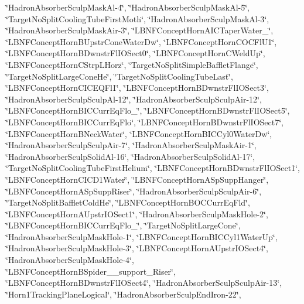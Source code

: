 \begin{DoxyCompactItemize}
\char`\"{}Hadron\-Absorber\-Sculp\-Mask\-Al-\/4\char`\"{}, \char`\"{}Hadron\-Absorber\-Sculp\-Mask\-Al-\/5\char`\"{}, \char`\"{}Target\-No\-Split\-Cooling\-Tube\-First\-Moth\char`\"{}, \char`\"{}Hadron\-Absorber\-Sculp\-Mask\-Al-\/3\char`\"{}, \char`\"{}Hadron\-Absorber\-Sculp\-Mask\-Air-\/3\char`\"{}, \char`\"{}L\-B\-N\-F\-Concept\-Horn\-A\-I\-C\-Taper\-Water\-\_\char`\"{}, \char`\"{}L\-B\-N\-F\-Concept\-Horn\-B\-Upstr\-Cone\-Water\-Dw\char`\"{}, \char`\"{}L\-B\-N\-F\-Concept\-Horn\-C\-O\-C\-Fl\-U1\char`\"{}, \char`\"{}L\-B\-N\-F\-Concept\-Horn\-B\-Dwnstr\-Fl\-I\-O\-Sect0\char`\"{}, \char`\"{}L\-B\-N\-F\-Concept\-Horn\-C\-Weld\-Up\char`\"{}, \char`\"{}L\-B\-N\-F\-Concept\-Horn\-C\-Strp\-L\-Horz\char`\"{}, \char`\"{}Target\-No\-Split\-Simple\-Bafflet\-Flange\char`\"{}, \char`\"{}Target\-No\-Split\-Large\-Cone\-He\char`\"{}, \char`\"{}Target\-No\-Split\-Cooling\-Tube\-Last\char`\"{}, \char`\"{}L\-B\-N\-F\-Concept\-Horn\-C\-I\-C\-E\-Q\-Fl1\char`\"{}, \char`\"{}L\-B\-N\-F\-Concept\-Horn\-B\-Dwnstr\-Fl\-I\-O\-Sect3\char`\"{}, \char`\"{}Hadron\-Absorber\-Sculp\-Sculp\-Al-\/12\char`\"{}, \char`\"{}Hadron\-Absorber\-Sculp\-Sculp\-Air-\/12\char`\"{}, \char`\"{}L\-B\-N\-F\-Concept\-Horn\-B\-I\-C\-Curr\-Eq\-Flo\-\_\char`\"{}, \char`\"{}L\-B\-N\-F\-Concept\-Horn\-B\-Dwnstr\-Fl\-I\-O\-Sect5\char`\"{}, \char`\"{}L\-B\-N\-F\-Concept\-Horn\-B\-I\-C\-Curr\-Eq\-Flo\char`\"{}, \char`\"{}L\-B\-N\-F\-Concept\-Horn\-B\-Dwnstr\-Fl\-I\-O\-Sect7\char`\"{}, \char`\"{}L\-B\-N\-F\-Concept\-Horn\-B\-Neck\-Water\char`\"{}, \char`\"{}L\-B\-N\-F\-Concept\-Horn\-B\-I\-C\-Cyl0\-Water\-Dw\char`\"{}, \char`\"{}Hadron\-Absorber\-Sculp\-Sculp\-Air-\/7\char`\"{}, \char`\"{}Hadron\-Absorber\-Sculp\-Mask\-Air-\/1\char`\"{}, \char`\"{}Hadron\-Absorber\-Sculp\-Solid\-Al-\/16\char`\"{}, \char`\"{}Hadron\-Absorber\-Sculp\-Solid\-Al-\/17\char`\"{}, \char`\"{}Target\-No\-Split\-Cooling\-Tube\-First\-Helium\char`\"{}, \char`\"{}L\-B\-N\-F\-Concept\-Horn\-B\-Dwnstr\-Fl\-I\-O\-Sect1\char`\"{}, \char`\"{}L\-B\-N\-F\-Concept\-Horn\-C\-I\-C\-D1\-Water\char`\"{}, \char`\"{}L\-B\-N\-F\-Concept\-Horn\-A\-Sp\-Supp\-Hanger\char`\"{}, \char`\"{}L\-B\-N\-F\-Concept\-Horn\-A\-Sp\-Supp\-Riser\char`\"{}, \char`\"{}Hadron\-Absorber\-Sculp\-Sculp\-Air-\/6\char`\"{}, \char`\"{}Target\-No\-Split\-Bafflet\-Cold\-He\char`\"{}, \char`\"{}L\-B\-N\-F\-Concept\-Horn\-B\-O\-C\-Curr\-Eq\-Fld\char`\"{}, \char`\"{}L\-B\-N\-F\-Concept\-Horn\-A\-Upstr\-I\-O\-Sect1\char`\"{}, \char`\"{}Hadron\-Absorber\-Sculp\-Mask\-Hole-\/2\char`\"{}, \char`\"{}L\-B\-N\-F\-Concept\-Horn\-B\-I\-C\-Curr\-Eq\-Flo\-\_\char`\"{}, \char`\"{}Target\-No\-Split\-Large\-Cone\char`\"{}, \char`\"{}Hadron\-Absorber\-Sculp\-Mask\-Hole-\/1\char`\"{}, \char`\"{}L\-B\-N\-F\-Concept\-Horn\-B\-I\-C\-Cyl1\-Water\-Up\char`\"{}, \char`\"{}Hadron\-Absorber\-Sculp\-Mask\-Hole-\/3\char`\"{}, \char`\"{}L\-B\-N\-F\-Concept\-Horn\-A\-Upstr\-I\-O\-Sect4\char`\"{}, \char`\"{}Hadron\-Absorber\-Sculp\-Mask\-Hole-\/4\char`\"{}, \char`\"{}L\-B\-N\-F\-Concept\-Horn\-B\-Spider\-\_\-\_\-support\-\_\-\-Riser\char`\"{}, \char`\"{}L\-B\-N\-F\-Concept\-Horn\-B\-Dwnstr\-Fl\-I\-O\-Sect4\char`\"{}, \char`\"{}Hadron\-Absorber\-Sculp\-Sculp\-Air-\/13\char`\"{}, \char`\"{}Horn1\-Tracking\-Plane\-Logical\char`\"{}, \char`\"{}Hadron\-Absorber\-Sculp\-End\-Iron-\/22\char`\"{}, 
\end{DoxyCompactItemize}
